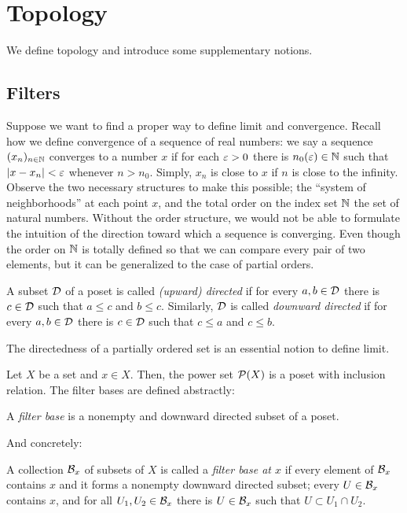 \documentclass{../crs}
\begin{document}
\section{Topology}
We define topology and introduce some supplementary notions.




\subsection{Filters}
Suppose we want to find a proper way to define limit and convergence.
Recall how we define convergence of a sequence of real numbers: we say a sequence $(x_n)_{n\in\mathbb{N}}$ converges to a number $x$ if for each $\varepsilon>0$ there is $n_0(\varepsilon)\in\mathbb{N}$ such that $|x-x_n|<\varepsilon$ whenever $n>n_0$.
Simply, $x_n$ is close to $x$ if $n$ is close to the infinity.
Observe the two necessary structures to make this possible; the ``system of neighborhoods'' at each point $x$, and the total order on the index set $\mathbb{N}$ the set of natural numbers.
Without the order structure, we would not be able to formulate the intuition of the direction toward which a sequence is converging.
Even though the order on $\mathbb{N}$ is totally defined so that we can compare every pair of two elements, but it can be generalized to the case of partial orders.
\begin{defn}
A subset $\mathcal{D}$ of a poset is called \emph{(upward) directed} if for every $a,b\in\mathcal{D}$ there is $c\in\mathcal{D}$ such that $a\le c$ and $b\le c$.
Similarly, $\mathcal{D}$ is called \emph{downward directed} if for every $a,b\in\mathcal{D}$ there is $c\in\mathcal{D}$ such that $c\le a$ and $c\le b$.
\end{defn}

The directedness of a partially ordered set is an essential notion to define limit.

Let $X$ be a set and $x\in X$.
Then, the power set $\mathcal{P}(X)$ is a poset with inclusion relation.
The filter bases are defined abstractly:
\begin{defn}
A \emph{filter base} is a nonempty and downward directed subset of a poset.
\end{defn}
And concretely:
\begin{defn}
A collection $\mathcal{B}_x$ of subsets of $X$ is called a \emph{filter base at $x$} if every element of $\mathcal{B}_x$ contains $x$ and it forms a nonempty downward directed subset; every $U\in\mathcal{B}_x$ contains $x$, and for all $U_1,U_2\in\mathcal{B}_x$ there is $U\in\mathcal{B}_x$ such that $U\subset U_1\cap U_2$.
\end{defn}
\end{document}

